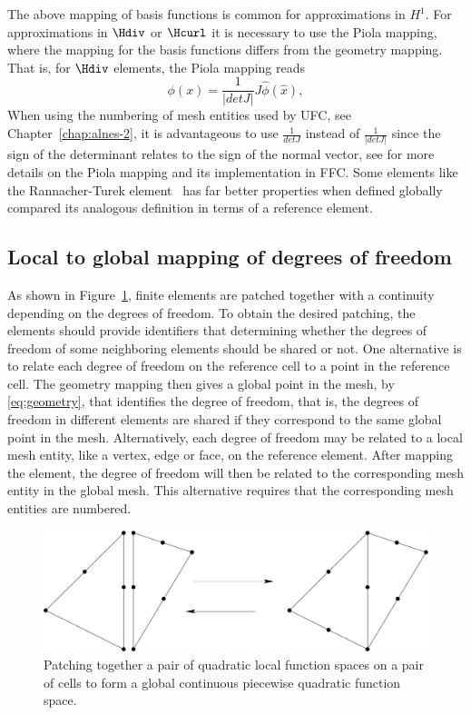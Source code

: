 The above mapping of basis functions is common for approximations in
$H^1$. For approximations in $\Hdiv$ or $\Hcurl$ it is necessary to use
the Piola mapping, where the mapping for the basis functions differs
from the geometry mapping. That is, for $\Hdiv$ elements, the Piola
mapping reads
\begin{equation}
\label{eq:subs}
\phi(x) = \frac{1}{|detJ|} J \hat{\phi}(\hat x),
\end{equation}
When using the numbering of mesh entities used by UFC, see
Chapter~\ref{chap:alnes-2}, it is advantageous to use $\frac{1}{detJ}$
instead of $\frac{1}{|detJ|}$ since the sign of the determinant relates
to the sign of the normal vector, see \citet{RognesKirbyLogg2009} for more
details on the Piola mapping and its implementation in FFC.  Some elements
like the Rannacher-Turek element~\citep{Turek1999,RannacherTurek1992}
has far better properties when defined globally compared its analogous
definition in terms of a reference element.


\subsection{Local to global mapping of degrees of freedom}

As shown in Figure~\ref{fig:kirby-1:patch}, finite elements are
patched together with a continuity depending on the degrees of freedom.
To obtain the desired patching, the elements should provide identifiers
that determining whether the degrees of freedom of some neighboring
elements should be shared or not.  One alternative is to relate each
degree of freedom on the reference cell to a point in the reference
cell. The geometry mapping then gives a global point in the mesh, by
\eqref{eq:geometry}, that identifies the degree of freedom, that is, the
degrees of freedom in different elements are shared if they correspond to
the same global point in the mesh.  Alternatively, each degree of freedom
may be related to a local mesh entity, like a vertex, edge or face, on the
reference element. After mapping the element, the degree of freedom will
then be related to the corresponding mesh entity in the global mesh. This
alternative requires that the corresponding mesh entities are numbered.

\begin{figure}
  \begin{center}
    \includegraphics[width=\largefig]{chapters/kirby-1/pdf/patch.pdf}
    \caption{Patching together a pair of quadratic local function
      spaces on a pair of cells to form a global continuous
      piecewise quadratic function space.}
    \label{fig:kirby-1:patch}
  \end{center}
\end{figure}
